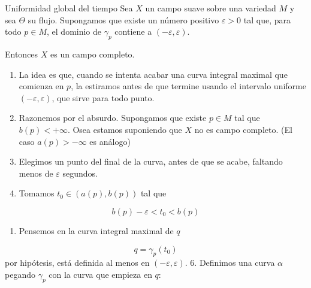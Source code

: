 \begin{booklemma}{Uniformidad global del tiempo}
Sea $X$ un campo suave sobre una variedad $M$ y sea $\Theta$ su flujo. Supongamos que existe un número positivo $\varepsilon>0$ tal que, para todo $p\in M$, el dominio de $\gamma_p$ contiene a $(-\varepsilon,\varepsilon)$.

Entonces $X$ es un campo completo.

\end{booklemma}
\begin{bookproof}{}
\begin{enumerate}
\item La idea es que, cuando se intenta acabar una curva integral maximal que comienza en $p$, la estiramos antes de que termine usando el intervalo uniforme $(-\varepsilon,\varepsilon)$, que sirve para todo punto.
\item Razonemos por el absurdo. Supongamos que existe $p\in M$ tal que $b(p)<+\infty$. Osea estamos suponiendo que $X$ no es campo completo. (El caso $a(p)>-\infty$ es análogo)
\item Elegimos un punto del final de la curva, antes de que se acabe, faltando menos de $\varepsilon$ segundos.
\item Tomamos $t_0\in(a(p),b(p))$ tal que
\end{enumerate}
\[
b(p)-\varepsilon<t_0<b(p)
\]
\begin{enumerate}[start=5]
\item Pensemos en la curva integral maximal de $q$
\end{enumerate}
\[
q=\gamma_p(t_0)
\]
por hipótesis, está definida al menos en $(-\varepsilon,\varepsilon)$. 6. Definimos una curva $\alpha$ pegando $\gamma_p$ con la curva que empieza en $q$:


\end{bookproof}
